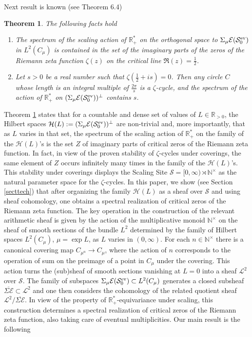 \documentclass{pspum-l}
\newtheorem{theorem}{Theorem}[section]
\theoremstyle{definition}
\theoremstyle{remark}
\numberwithin{equation}{section}
\def\R{{\mathbb R}}
\def\cE{{\mathcal E}}
\def\cL{{\mathcal L}}
\def\cH{{\mathcal H}}
\def\cS{{\mathcal S}}
\def\sr0{{\cS^{\rm ev}_0}}
\def\rnt{{[0,\infty)\rtimes{\N^{\times}}}}
\def\N{{\mathbb N}}
\def\scal2{{\mathscr S}}
\begin{document}
 Next result  is known (see \cite{ccspectral} Theorem 6.4)
\begin{theorem}\label{spectralreal} The following facts hold
\begin{enumerate}
    \item[(i)] The spectrum of the scaling action  of  $\R_+^*$ on the orthogonal space  to $\Sigma_\mu \cE(\sr0)$ in $L^2(C_\mu)$  is contained in the set of the imaginary parts of the zeros of the Riemann zeta function $\zeta(z)$ on the critical line $\Re(z)=\frac 12$.
\item[(ii)] Let $s>0$ be a real number such that $\zeta(\frac 12+is)=0$. Then any circle $C$ whose length is an integral multiple of $\frac{2\pi} s$ is a $\zeta$-cycle, and the spectrum of the action of $\R_+^*$ on  $(\Sigma_\mu \cE(\sr0))^\perp$ contains $s$.
\end{enumerate}
\end{theorem}

Theorem \ref{spectralreal} states that for a countable and dense set of values of $L\in\R_{>0}$, the Hilbert spaces $\cH(L):=(\Sigma_\mu \cE(\sr0))^\perp$ are non-trivial  and, more importantly, that as $L$ varies in that set,  the spectrum of the scaling action of $\R_+^*$ on the family of the $\cH(L)$'s is  the set $Z$ of imaginary parts of critical zeros of the Riemann zeta function. In fact, in view of the proven stability of $\zeta$-cycles under coverings, the same element of $Z$ occurs infinitely many times in the family of the $\cH(L)$'s. 
This stability under coverings displays the Scaling Site $\scal2=\rnt$ as the natural parameter space for the $\zeta$-cycles. In this paper, we show (see Section \ref{secttech}) that after organizing the family  $\cH(L)$ as a sheaf over $\scal2$  and using sheaf cohomology, one obtains a  spectral realization of  critical zeros of the Riemann zeta function. The key operation in the construction of the relevant arithmetic sheaf  is given by  the  action of the multiplicative monoid $\N^\times$  on the sheaf  of smooth sections of the bundle $L^2$ determined by the family of Hilbert spaces $L^2(C_\mu)$, $\mu={\exp L}$,  as $L$ varies in  $(0,\infty)$. For each $n\in\N^\times$ there is a canonical covering map $C_{\mu^n}\to C_\mu$,  where the action of $n$  corresponds to the operation of sum on the preimage of a point in $C_\mu$ under the covering.  This  action turns the  (sub)sheaf of smooth sections vanishing at $L=0$ into a sheaf $\cL^2$ over  $\scal2$. The family of  
 subspaces $\Sigma_\mu \cE(\sr0)\subset L^2(C_\mu)$  generates a closed subsheaf $\overline{\Sigma\cE}\subset \cL^2$    and one  then considers the cohomology of the related  quotient sheaf  $\cL^2/\overline{\Sigma\cE}$.  In view of the property of $\R_+^*$-equivariance under scaling, this construction  determines a spectral realization of  critical zeros of the Riemann zeta function, also taking care of eventual  multiplicities. Our main result is the following
 
\end{document}
